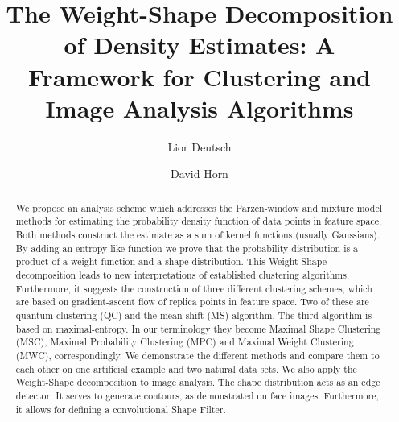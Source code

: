\documentclass[preprint,12pt]{elsarticle}
\begin{document}
\begin{frontmatter}



\title{The Weight-Shape Decomposition of Density Estimates: A Framework for Clustering and Image Analysis Algorithms}


\author[tau]{Lior Deutsch}
\author[tau]{David Horn}

\address[tau]{Tel Aviv University, Tel Aviv, Israel}

\begin{abstract}
We propose an analysis scheme which addresses the Parzen-window and mixture model methods for estimating the probability density function of data points in feature space. Both methods construct the estimate as a sum of kernel functions (usually Gaussians). By adding an entropy-like function we prove that the probability distribution is a product of a weight function and a shape distribution. This Weight-Shape decomposition leads to new interpretations of established clustering algorithms. Furthermore, it suggests the construction of three different clustering schemes, which are based on gradient-ascent flow of replica points in feature space. Two of these are quantum clustering (QC) and the mean-shift (MS) algorithm. The third algorithm is based on maximal-entropy. In our terminology they become Maximal Shape Clustering (MSC), Maximal Probability Clustering (MPC) and Maximal Weight Clustering (MWC), correspondingly. We demonstrate the different methods and compare them to each other on one artificial example and two natural data sets. We also apply the Weight-Shape decomposition to image analysis. The shape distribution acts as an edge detector. It serves to generate contours, as demonstrated on face images. Furthermore, it allows for defining a convolutional Shape Filter.


\end{abstract}
\end{frontmatter}
\end{document}

